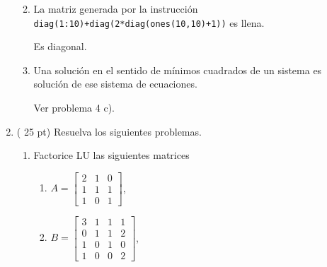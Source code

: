 \documentclass[11pt]{article}
\begin{document}
\begin{enumerate}
\begin{enumerate}
\begin{minipage}{0.4\textwidth}
    \end{minipage} 
    \vspace{5mm}
    \item {} 
    \begin{minipage}{0.4\textwidth}
	La matriz generada por la instrucci\'on \texttt{diag(1:10)+diag(2*diag(ones(10,10)+1))} es llena.
	\end{minipage} 
    \begin{minipage}{0.4\textwidth}
	Es diagonal.
    
    \end{minipage} 
        \vspace{5mm}
    \item {} 
    \begin{minipage}{0.4\textwidth}
	Una soluci\'on en el sentido de m\'inimos cuadrados de un sistema es soluci\'on de ese sistema de ecuaciones.
	\end{minipage} 
    \begin{minipage}{0.4\textwidth}
	Ver problema 4 c).
    
    \end{minipage} 
\end{enumerate}

 
 \newpage
 \item ( 25 pt)  Resuelva los siguientes problemas.
\begin{enumerate}
\item
Factorice LU las siguientes matrices
 \begin{multicols}{3}
 \begin{enumerate}
 \item 
 $A=
 \begin{bmatrix}
2 & 1 & 0 \\
1 & 1 & 1 \\
1 & 0 & 1
\end{bmatrix}$,

 \item 
 $B=
 \begin{bmatrix}
3 & 1 & 1 & 1 \\
0 & 1 & 1 & 2 \\
1 & 0 & 1 & 0 \\
1 & 0 & 0 & 2
\end{bmatrix}$,


\end{enumerate}
\end{multicols}
\end{enumerate}
\end{enumerate}
\end{document}
